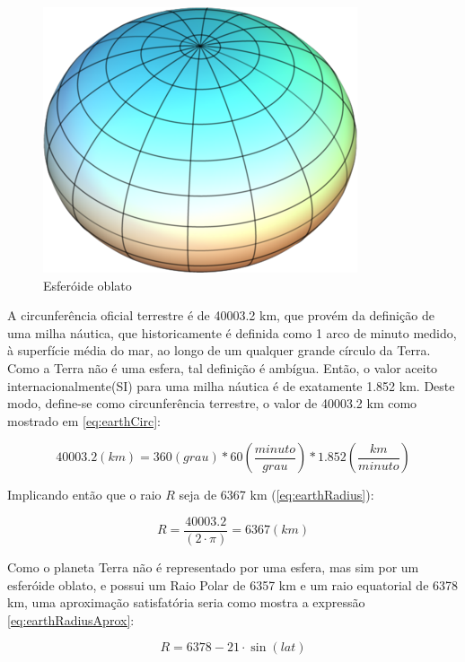 \begin{figure}[h]
	\centering	
	\includegraphics[scale=0.3]{Figuras/OblateSpheroid.PNG}
	\caption{Esferóide oblato}
	\label{fig:OblateSpheroid}
\end{figure}

A circunferência oficial terrestre é de 40003.2 km, que provém da definição de uma milha náutica, que historicamente é definida como 1 arco de minuto medido, à superfície média do mar, ao longo de um qualquer grande círculo da Terra. Como a Terra não é uma esfera, tal definição é ambígua. Então, o valor aceito internacionalmente(SI) para uma milha náutica é de exatamente 1.852 km. Deste modo, define-se como circunferência terrestre, o valor de 40003.2 km como mostrado em \ref{eq:earthCirc}:

\begin{equation}
\label{eq:earthCirc}
40003.2 (km) = 360(grau) * 60\left(\frac{minuto}{grau}\right) * 1.852\left(\frac{km}{minuto}\right)  
\end{equation}


Implicando então que o raio \(R\) seja de 6367 km (\ref{eq:earthRadius}):

\begin{equation}
\label{eq:earthRadius}
R = \frac{40003.2}{(2 \cdot \pi)} = 6367 (km)
\end{equation}

Como o planeta Terra não é representado por uma esfera, mas sim por um esferóide oblato, e possui um Raio Polar de 6357 km e um raio equatorial de 6378 km, uma aproximação satisfatória seria como mostra a expressão \ref{eq:earthRadiusAprox}:

\begin{equation}
\label{eq:earthRadiusAprox}
R = 6378 - 21 \cdot \sin(lat)
\end{equation}

